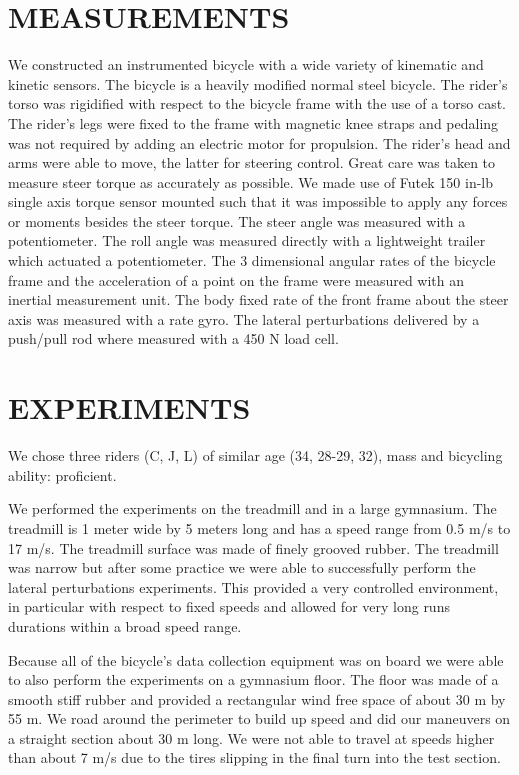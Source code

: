 \documentclass[twocolumn,10pt]{asme2e}
\begin{document}
\section*{MEASUREMENTS}
We constructed an instrumented bicycle with a wide variety of kinematic and
kinetic sensors. The bicycle is a heavily modified normal steel bicycle. The
rider's torso was rigidified with respect to the bicycle frame with the use of
a torso cast. The rider's legs were fixed to the frame with magnetic knee
straps and pedaling was not required by adding an electric motor for
propulsion. The rider's head and arms were able to move, the latter for
steering control. Great care was taken to measure steer torque as accurately as
possible. We made use of Futek 150 in-lb single axis torque sensor mounted such
that it was impossible to apply any forces or moments besides the steer torque.
The steer angle was measured with a potentiometer. The roll angle was measured
directly with a lightweight trailer which actuated a potentiometer. The 3
dimensional angular rates of the bicycle frame and the acceleration of a point
on the frame were measured with an inertial measurement unit. The body fixed
rate of the front frame about the steer axis was measured with a rate gyro. The
lateral perturbations delivered by a push/pull rod where measured with a 450
N load cell.

\section*{EXPERIMENTS}
We chose three riders (C, J, L) of similar age (34, 28-29, 32), mass and
bicycling ability: proficient.

We performed the experiments on the treadmill and in a large gymnasium. The
treadmill is 1 meter wide by 5 meters long and has a speed range from 0.5 m/s
to 17 m/s. The treadmill surface was made of finely grooved rubber. The
treadmill was narrow but after some practice we were able to successfully
perform the lateral perturbations experiments. This provided a very controlled
environment, in particular with respect to fixed speeds and allowed for very
long runs durations within a broad speed range.

Because all of the bicycle's data collection equipment was on board we were
able to also perform the experiments on a gymnasium floor. The floor was made
of a smooth stiff rubber and provided a rectangular wind free space of about 30
m by 55 m. We road around the perimeter to build up speed and did our maneuvers
on a straight section about 30 m long. We were not able to travel at speeds
higher than about 7 m/s due to the tires slipping in the final turn into the
test section.
\end{document}
